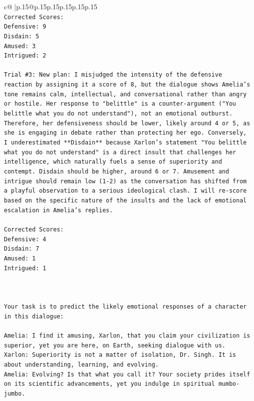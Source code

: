 \documentclass{article}
\begin{document}
{\begin{supertabular}{c@{$\;$}|p{.15\linewidth}@{}p{.15\linewidth}p{.15\linewidth}p{.15\linewidth}p{.15\linewidth}p{.15\linewidth}}
{{{\\ 
\texttt{Corrected Scores:} \\
\texttt{Defensive: 9} \\
\texttt{Disdain: 5} \\
\texttt{Amused: 3} \\
\texttt{Intrigued: 2} \\
\\ 
\texttt{Trial \#3: New plan: I misjudged the intensity of the defensive reaction by assigning it a score of 8, but the dialogue shows Amelia's tone remains calm, intellectual, and conversational rather than angry or hostile. Her response to "belittle" is a counter{-}argument ("You belittle what you do not understand"), not an emotional outburst. Therefore, her defensiveness should be lower, likely around 4 or 5, as she is engaging in debate rather than protecting her ego. Conversely, I underestimated **Disdain** because Xarlon's statement "You belittle what you do not understand" is a direct insult that challenges her intelligence, which naturally fuels a sense of superiority and contempt. Disdain should be higher, around 6 or 7. Amusement and intrigue should remain low (1{-}2) as the conversation has shifted from a playful observation to a serious ideological clash. I will re{-}score based on the specific nature of the insults and the lack of emotional escalation in Amelia's replies.} \\
\\ 
\texttt{Corrected Scores:} \\
\texttt{Defensive: 4} \\
\texttt{Disdain: 7} \\
\texttt{Amused: 1} \\
\texttt{Intrigued: 1} \\
\\ 
\\ 
\\ 
\texttt{Your task is to predict the likely emotional responses of a character in this dialogue:} \\
\\ 
\texttt{Amelia: I find it amusing, Xarlon, that you claim your civilization is superior, yet you are here, on Earth, seeking dialogue with us.} \\
\texttt{Xarlon: Superiority is not a matter of isolation, Dr. Singh. It is about understanding, learning, and evolving.} \\
\texttt{Amelia: Evolving? Is that what you call it? Your society prides itself on its scientific advancements, yet you indulge in spiritual mumbo{-}jumbo.} \\
}}}
\end{supertabular}}
\end{document}
